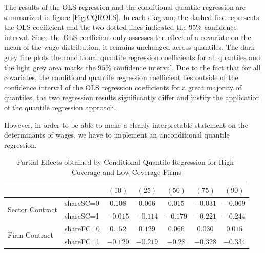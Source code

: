 The results of the OLS regression and the conditional quantile regression are summarized in figure \ref{Fig:CQROLS}. In each diagram, the dashed line represents the OLS coefficient and the two dotted lines indicated the $95\%$ confidence interval. Since the OLS coefficient only assesses the effect of a covariate on the mean of the wage distribution, it remains unchanged across quantiles. The dark grey line plots the conditional quantile regression coefficients for all quantiles and the light grey area marks the $95\%$ confidence interval. Due to the fact that for all covariates, the conditional quantile regression coefficient lies outside of the confidence interval of the OLS regression coefficients for a great majority of quantiles, the two regression results significantly differ and justify the application of the quantile regression approach.

However, in order to be able to make a clearly interpretable statement on the determinants of wages, we have to implement an unconditional quantile regression.

\begin{table}[]
\scriptsize
\centering
\caption{Partial Effects obtained by Conditional Quantile Regression for High-Coverage and Low-Coverage Firms}
\label{PEs:CQR:LH}
\begin{tabular}{ll|ccccc}

              &      & $(10)$ & $(25)$ & $(50)$ & $(75)$ & $(90)$ \\
  \hline
  \multirow{2}{*}{Sector Contract} & shareSC=0  & $0.108$ & $0.066$ & $0.015$ & $-0.031$ & $-0.069$ \\
  & shareSC=1    & $-0.015$ & $-0.114$ & $-0.179$ & $-0.221$ & $-0.244$ \\
  \multirow{2}{*}{Firm Contract} & shareFC=0           & $0.152$ & $0.129$ & $0.066$ & $0.030$ & $0.015$ \\
  & shareFC=1           & $-0.120$ & $-0.219$ & $-0.28$ & $-0.328$ & $-0.334$ \\
  \hline
\end{tabular}
\end{table}

